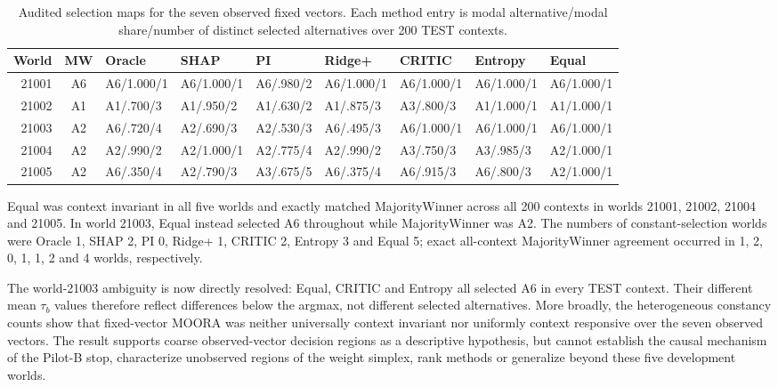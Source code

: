 \documentclass[runningheads,orivec]{llncs}
\begin{document}
\begin{table}[t]
\centering
\caption{Audited selection maps for the seven observed fixed vectors. Each method entry is
modal alternative/modal share/number of distinct selected alternatives over 200 TEST contexts.}
\label{supp:tab:fixedselectionmaps}
\scriptsize
\setlength{\tabcolsep}{2.1pt}
\begin{tabular}{@{}rclllllll@{}}
\toprule
World & MW & Oracle & SHAP & PI & Ridge+ & CRITIC & Entropy & Equal\\
\midrule
21001 & A6 & A6/1.000/1 & A6/1.000/1 & A6/.980/2 & A6/1.000/1 & A6/1.000/1 & A6/1.000/1 & A6/1.000/1\\
21002 & A1 & A1/.700/3 & A1/.950/2 & A1/.630/2 & A1/.875/3 & A3/.800/3 & A1/1.000/1 & A1/1.000/1\\
21003 & A2 & A6/.720/4 & A2/.690/3 & A2/.530/3 & A6/.495/3 & A6/1.000/1 & A6/1.000/1 & A6/1.000/1\\
21004 & A2 & A2/.990/2 & A2/1.000/1 & A2/.775/4 & A2/.990/2 & A3/.750/3 & A3/.985/3 & A2/1.000/1\\
21005 & A2 & A6/.350/4 & A2/.790/3 & A3/.675/5 & A6/.375/4 & A6/.915/3 & A6/.800/3 & A2/1.000/1\\
\bottomrule
\end{tabular}
\end{table}

Equal was context invariant in all five worlds and exactly matched MajorityWinner across all
200 contexts in worlds 21001, 21002, 21004 and 21005. In world 21003, Equal instead selected A6
throughout while MajorityWinner was A2. The numbers of constant-selection worlds were
Oracle 1, SHAP 2, PI 0, Ridge+ 1, CRITIC 2, Entropy 3 and Equal 5; exact all-context
MajorityWinner agreement occurred in 1, 2, 0, 1, 1, 2 and 4 worlds, respectively.

The world-21003 ambiguity is now directly resolved: Equal, CRITIC and Entropy all selected A6
in every TEST context. Their different mean $\tau_b$ values therefore reflect differences below
the argmax, not different selected alternatives. More broadly, the heterogeneous constancy
counts show that fixed-vector MOORA was neither universally context invariant nor uniformly
context responsive over the seven observed vectors. The result supports coarse
observed-vector decision regions as a descriptive hypothesis, but cannot establish the causal
mechanism of the Pilot-B stop, characterize unobserved regions of the weight simplex, rank
methods or generalize beyond these five development worlds.
\end{document}
